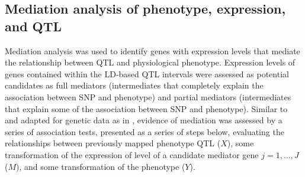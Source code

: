 \subsection{Mediation analysis of phenotype, expression, and QTL}

Mediation analysis was used to identify genes with expression levels that mediate the relationship between QTL and physiological phenotype. Expression levels of genes contained within the LD-based QTL intervals were assessed as potential candidates as full mediators (intermediates that completely explain the association between SNP and phenotype) and partial mediators (intermediates that explain some of the association between SNP and phenotype). Similar to \cite{Baron1986} and adapted for genetic data as in \cite{Battle2014}, evidence of mediation was assessed by a series of association tests, presented as a series of steps below, evaluating the relationships between previously mapped phenotype QTL ($X$), some transformation of the expression of level of a candidate mediator gene $j=1,\dots,J$ ($M$), and some transformation of the phenotype ($Y$).
